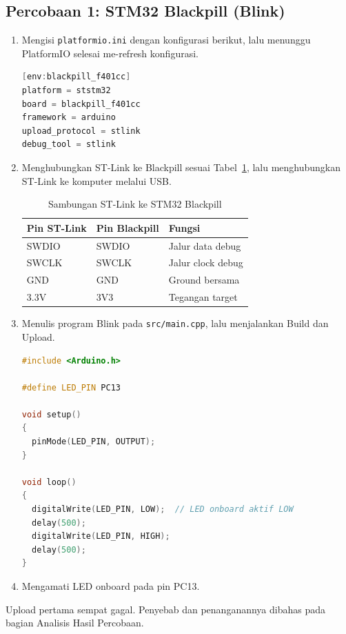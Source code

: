 \subsection{Percobaan 1: STM32 Blackpill (Blink)}
\begin{enumerate}
	\item Mengisi \texttt{platformio.ini} dengan konfigurasi berikut, lalu menunggu PlatformIO selesai me-refresh konfigurasi.
\begin{lstlisting}[language=C, caption={platformio.ini Percobaan 1}]
[env:blackpill_f401cc]
platform = ststm32
board = blackpill_f401cc
framework = arduino
upload_protocol = stlink
debug_tool = stlink
\end{lstlisting}

	\item Menghubungkan ST-Link ke Blackpill sesuai Tabel~\ref{tab:stlink}, lalu menghubungkan ST-Link ke komputer melalui USB.
\begin{table}[H]
	\centering
	\caption{Sambungan ST-Link ke STM32 Blackpill}
	\label{tab:stlink}
	\begin{tabular}{|l|l|l|}
		\hline
		\textbf{Pin ST-Link} & \textbf{Pin Blackpill} & \textbf{Fungsi} \\ \hline
		SWDIO & SWDIO & Jalur data debug \\ \hline
		SWCLK & SWCLK & Jalur clock debug \\ \hline
		GND & GND & Ground bersama \\ \hline
		3.3V & 3V3 & Tegangan target \\ \hline
	\end{tabular}
\end{table}

	\item Menulis program Blink pada \texttt{src/main.cpp}, lalu menjalankan Build dan Upload.
\begin{lstlisting}[language=C++, caption={Program Blink STM32 (Arduino)}]
#include <Arduino.h>

#define LED_PIN PC13

void setup()
{
  pinMode(LED_PIN, OUTPUT);
}

void loop()
{
  digitalWrite(LED_PIN, LOW);  // LED onboard aktif LOW
  delay(500);
  digitalWrite(LED_PIN, HIGH);
  delay(500);
}
\end{lstlisting}

	\item Mengamati LED onboard pada pin PC13.
\end{enumerate}
Upload pertama sempat gagal. Penyebab dan penanganannya dibahas pada bagian Analisis Hasil Percobaan.

